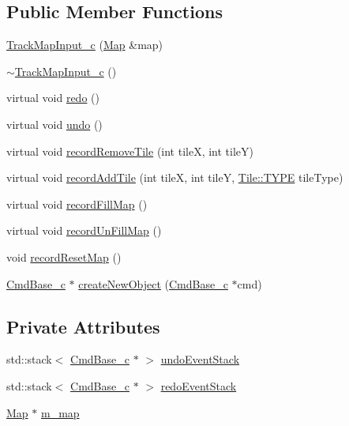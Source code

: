 \subsection*{Public Member Functions}
\begin{DoxyCompactItemize}
\item 
\hyperlink{class_track_map_input__c_a00d9fec06d73d0ad95760f8770c1d3b1}{Track\+Map\+Input\+\_\+c} (\hyperlink{class_map}{Map} \&map)
\item 
\hyperlink{class_track_map_input__c_a434c67365792d8b9fdd12d1c5969bce6}{$\sim$\+Track\+Map\+Input\+\_\+c} ()
\item 
virtual void \hyperlink{class_track_map_input__c_a4491e6a575211ee7c90ef09e2c8985c5}{redo} ()
\item 
virtual void \hyperlink{class_track_map_input__c_a2365bd5ca234cead62f4cc060f3d5ce1}{undo} ()
\item 
virtual void \hyperlink{class_track_map_input__c_ac5e3d19a8902d2c68f20531974a6a9b8}{record\+Remove\+Tile} (int tile\+X, int tile\+Y)
\item 
virtual void \hyperlink{class_track_map_input__c_a5287b682e102d4d12ff1cf5d7e1029ec}{record\+Add\+Tile} (int tile\+X, int tile\+Y, \hyperlink{class_tile_acb53d82f9dacff45a98acc63276928eb}{Tile\+::\+T\+Y\+P\+E} tile\+Type)
\item 
virtual void \hyperlink{class_track_map_input__c_a5118fc2fdbf1a9612a0e9dc6225a0d39}{record\+Fill\+Map} ()
\item 
virtual void \hyperlink{class_track_map_input__c_a677765b189904a05c285d1d17b02a032}{record\+Un\+Fill\+Map} ()
\item 
void \hyperlink{class_track_map_input__c_a0ceb17cc87de43351fc6a3409356478c}{record\+Reset\+Map} ()
\item 
\hyperlink{class_cmd_base__c}{Cmd\+Base\+\_\+c} $\ast$ \hyperlink{class_track_map_input__c_a508d5ac86762b8269dfb1755d1eb1183}{create\+New\+Object} (\hyperlink{class_cmd_base__c}{Cmd\+Base\+\_\+c} $\ast$cmd)
\end{DoxyCompactItemize}
\subsection*{Private Attributes}
\begin{DoxyCompactItemize}
\item 
std\+::stack$<$ \hyperlink{class_cmd_base__c}{Cmd\+Base\+\_\+c} $\ast$ $>$ \hyperlink{class_track_map_input__c_af8132fe4139361e7ff0e06b2ed19eb4d}{undo\+Event\+Stack}
\item 
std\+::stack$<$ \hyperlink{class_cmd_base__c}{Cmd\+Base\+\_\+c} $\ast$ $>$ \hyperlink{class_track_map_input__c_adbb2c952b62701ddbf835979484e38b3}{redo\+Event\+Stack}
\item 
\hyperlink{class_map}{Map} $\ast$ \hyperlink{class_track_map_input__c_ac97a1987b2dbb6826e5bf5c8ef3e4283}{m\+\_\+map}
\end{DoxyCompactItemize}


